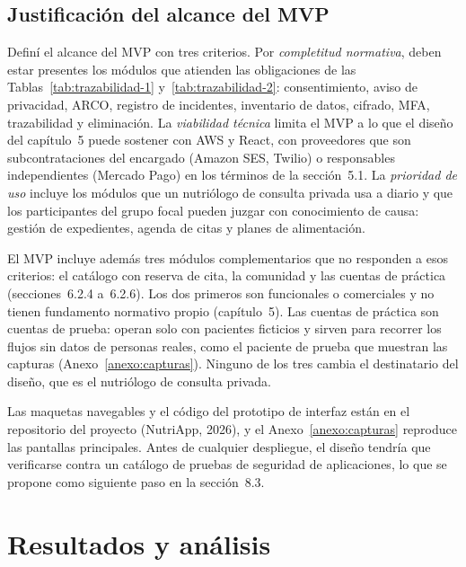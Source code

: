 \documentclass[12pt, a4paper]{article}
\makeatletter
\newcommand{\saltoseccion}{\par
  \ifx\@deferlist\@empty
    \ifdim\pagegoal<\maxdimen
      \ifdim\dimexpr\textheight-\pagegoal+\pagetotal\relax>0.5\textheight\clearpage\fi
    \fi
  \else\clearpage\fi}
\let\seccionbase\section
\renewcommand{\section}{\saltoseccion\seccionbase}
\makeatother
\begin{document}
\subsection{Justificación del alcance del MVP}
 
Definí el alcance del MVP con tres criterios. Por
\textit{completitud normativa}, deben estar presentes los módulos que
atienden las obligaciones de las Tablas~\ref{tab:trazabilidad-1}
y~\ref{tab:trazabilidad-2}: consentimiento, aviso de privacidad, ARCO, registro de
incidentes, inventario de datos, cifrado, MFA, trazabilidad y eliminación. La \textit{viabilidad
técnica} limita el MVP a lo que el diseño del capítulo~5 puede
sostener con AWS y React, con proveedores que son subcontrataciones
del encargado (Amazon SES, Twilio) o responsables independientes
(Mercado Pago) en los términos de la sección~5.1. La \textit{prioridad de uso} incluye los módulos
que un nutriólogo de consulta privada usa a diario y que los
participantes del grupo focal pueden juzgar con conocimiento de causa: gestión de
expedientes, agenda de citas y planes de alimentación.

El MVP incluye además tres módulos complementarios que no responden a
esos criterios: el catálogo con reserva de cita, la comunidad y las
cuentas de práctica (secciones~6.2.4 a~6.2.6). Los dos primeros son
funcionales o comerciales y no tienen fundamento normativo propio
(capítulo~5). Las cuentas de práctica son cuentas de prueba: operan
solo con pacientes ficticios y sirven para recorrer los flujos sin
datos de personas reales, como el paciente de prueba que muestran las
capturas (Anexo~\ref{anexo:capturas}). Ninguno de los tres cambia el
destinatario del diseño, que es el nutriólogo de consulta privada.
 
Las maquetas navegables y el código del prototipo de interfaz están en el
repositorio del proyecto (NutriApp, 2026), y el Anexo~\ref{anexo:capturas} reproduce las
pantallas principales. Antes de cualquier despliegue, el diseño tendría
que verificarse contra un catálogo de pruebas de seguridad de
aplicaciones, lo que se propone como siguiente paso en la
sección~8.3.
 
\section{Resultados y análisis}
\end{document}
